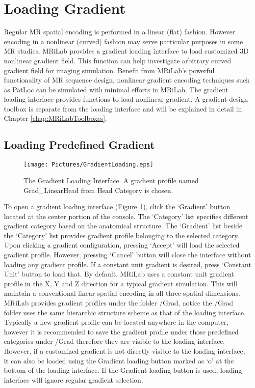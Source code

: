 \documentclass{book}%
\begin{document}
\section{Loading Gradient}
Regular MR spatial encoding is performed in a linear (flat) fashion. However encoding in a nonlinear (curved) fashion may serve particular purposes in some MR studies. MRiLab provides a gradient loading interface to load customized 3D nonlinear gradient field. This function can help investigate arbitrary curved gradient field for imaging simulation. Benefit from MRiLab's powerful functionality of MR sequence design, nonlinear gradient encoding techniques such as PatLoc can be simulated with minimal efforts in MRiLab. The gradient loading interface provides functions to load nonlinear gradient. A gradient design toolbox is separate from the loading interface and will be explained in detail in Chapter \ref{chap:MRiLabToolboxes}.

\subsection{Loading Predefined Gradient}

\begin{figure}[htbp]
	\centering
		\texttt{[image: Pictures/GradientLoading.eps]}
	\caption{The Gradient Loading Interface. A gradient profile named Grad\_LinearHead from Head Category is chosen.}
	\label{fig:GradientLoading}
\end{figure}

To open a gradient loading interface (Figure \ref{fig:GradientLoading}), click the `Gradient' button located at the center portion of the console. The `Category' list specifies different gradient category based on the anatomical structure. The `Gradient' list beside the `Category' list provides gradient profile belonging to the selected category. Upon clicking a gradient configuration, pressing `Accept' will load the selected gradient profile. However, pressing `Cancel' button will close the interface without loading any gradient profile. If a constant unit gradient is desired, press `Constant Unit' button to load that. By default, MRiLab uses a constant unit gradient profile in the X, Y and Z direction for a typical gradient simulation. This will maintain a conventional linear spatial encoding in all three spatial dimensions. \\

MRiLab provides gradient profiles under the folder /Grad, notice the /Grad folder uses the same hierarchic structure scheme as that of the loading interface. Typically a new gradient profile can be located anywhere in the computer, however it is recommended to save the gradient profile under those predefined categories under /Grad therefore they are visible to the loading interface. However, if a customized gradient is not directly visible to the loading interface, it can also be loaded using the Gradient loading button marked as `o' at the bottom of the loading interface. If the Gradient loading button is used, loading interface will ignore regular gradient selection.
\end{document}
